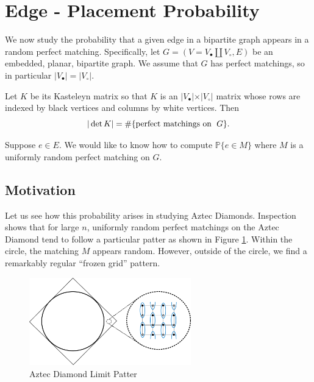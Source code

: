 \documentclass{article}
\begin{document}
\section{Edge - Placement Probability}

\hspace{1cm} We now study the probability that a given edge in a bipartite graph appears in a random perfect matching. Specifically, let $G = (V = V_\bullet \amalg V_\circ, E)$ be an embedded, planar, bipartite graph. We assume that $G$ has perfect matchings, so in particular $\vert V_\bullet \vert = \vert V_\circ \vert$. 

Let $K$ be its Kasteleyn matrix so that $K$ is an $\vert V_\bullet \vert \times \vert V_\circ \vert$ matrix whose rows are indexed by black vertices and columns by white vertices. Then 
$$
\vert \det K \vert = \#\{ \text{perfect matchings on \hspace{.1cm}} G\}. 
$$

Suppose $e \in E$. We would like to know how to compute $\mathbb{P} \{e \in M\}$ where $M$ is a uniformly random perfect matching on $G$. 

\subsection{Motivation}

\hspace{1cm} Let us see how this probability arises in studying Aztec Diamonds. Inspection shows that for large $n$, uniformly random perfect matchings on the Aztec Diamond tend to follow a particular patter as shown in Figure \ref{fig:adl}. Within the circle, the matching $M$ appears random. However, outside of the circle, we find a remarkably regular ``frozen grid'' pattern. 
\begin{figure}[h]
	\begin{center}
 	\includegraphics[width=7cm]{figures/aztec_diamond_limit.png}
  	\caption{Aztec Diamond Limit Patter}
	\label{fig:adl}
 	 \end{center}
\end{figure}
\end{document}
